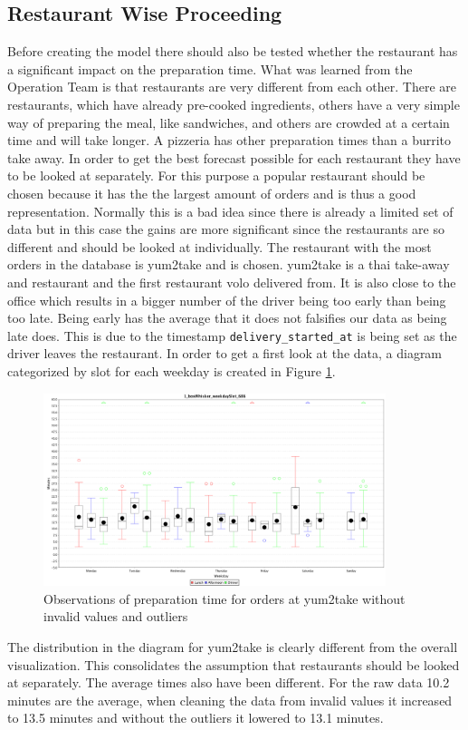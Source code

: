 \subsection{Restaurant Wise Proceeding}\label{subsection:Restaurant Wise Proceeding}
Before creating the model there should also be tested whether the restaurant has a significant impact on the preparation time.\newline
What was learned from the Operation Team is that restaurants are very different from each other. There are restaurants, which have already pre-cooked ingredients, others have a very simple way of preparing the meal, like sandwiches, and others are crowded at a certain time and will take longer. A pizzeria has other preparation times than a burrito take away.\newline
In order to get the best forecast possible for each restaurant they have to be looked at separately. For this purpose a popular restaurant should be chosen because it has the the largest amount of orders and is thus a good representation. Normally this is a bad idea since there is already a limited set of data but in this case the gains are more significant since the restaurants are so different and should be looked at individually.\newline
The restaurant with the most orders in the database is yum2take and is chosen. yum2take is a thai take-away and restaurant and the first restaurant volo delivered from. It is also close to the office which results in a bigger number of the driver being too early than being too late. Being early has the average that it does not falsifies our data as being late does. This is due to the timestamp \texttt{delivery\_started\_at} is being set as the driver leaves the restaurant. In order to get a first look at the data, a diagram categorized by slot for each weekday is created in Figure  \ref{fig:1_boxWhisker_weekdaySlot_686}.
\begin{figure}[h]
\begin{center}
\includegraphics[width=10cm]{images/1_boxWhisker_weekdaySlot_686.png}
\caption{Observations of preparation time for orders at yum2take without invalid values and outliers}
\label{fig:1_boxWhisker_weekdaySlot_686}
\end{center}
\end{figure}
The distribution in the diagram for yum2take is clearly different from the overall visualization. This consolidates the assumption that restaurants should be looked at separately. The average times also have been different. For the raw data 10.2 minutes are the average, when cleaning the data from invalid values it increased to 13.5 minutes and without the outliers it lowered to 13.1 minutes.
